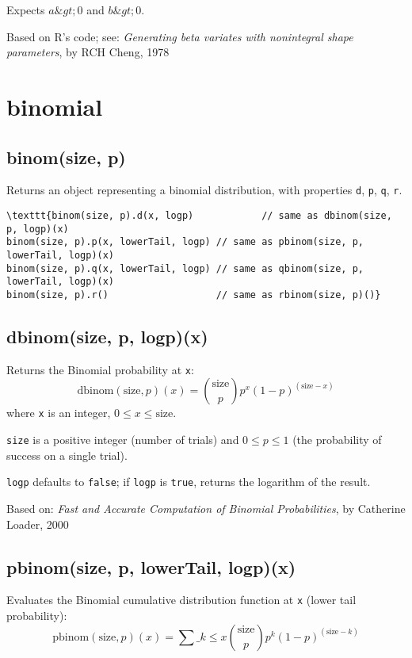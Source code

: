 \documentclass{article}
\begin{document}
Expects $a\&gt;0$ and $b\&gt;0$.


Based on R's code; see: \emph{Generating beta variates with nonintegral shape parameters}, by
RCH Cheng, 1978


  \section{binomial}
    \subsection*{binom(size, p)}
    Returns an object representing a binomial distribution, with properties \texttt{d}, \texttt{p}, \texttt{q}, \texttt{r}.


\begin{lstlisting}
\texttt{binom(size, p).d(x, logp)            // same as dbinom(size, p, logp)(x)
binom(size, p).p(x, lowerTail, logp) // same as pbinom(size, p, lowerTail, logp)(x)
binom(size, p).q(x, lowerTail, logp) // same as qbinom(size, p, lowerTail, logp)(x)
binom(size, p).r()                   // same as rbinom(size, p)()}\end{lstlisting}

    \subsection*{dbinom(size, p, logp)(x)}
    Returns the Binomial probability at \texttt{x}:
$$\textrm{dbinom}(\textrm{size}, p)(x) = \binom{\textrm{size}}{p}p^{x}(1-p)^{(\textrm{size}-x)}$$
where \texttt{x} is an integer, $0 \leq x \leq \textrm{size}$.


\texttt{size} is a positive integer (number of trials) and $0 \leq p \leq 1$
(the probability of success on a single trial).


\texttt{logp} defaults to \texttt{false}; if \texttt{logp} is \texttt{true}, returns the
logarithm of the result.


Based on: \emph{Fast and Accurate Computation of Binomial Probabilities},
by Catherine Loader, 2000


    \subsection*{pbinom(size, p, lowerTail, logp)(x)}
    Evaluates the Binomial cumulative distribution
function at \texttt{x} (lower tail probability):
$$\textrm{pbinom}(\textrm{size}, p)(x) = \sum\_{k \leq x} \binom{\textrm{size}}{p}p^{k}(1-p)^{(\textrm{size}-k)}$$
\end{document}
